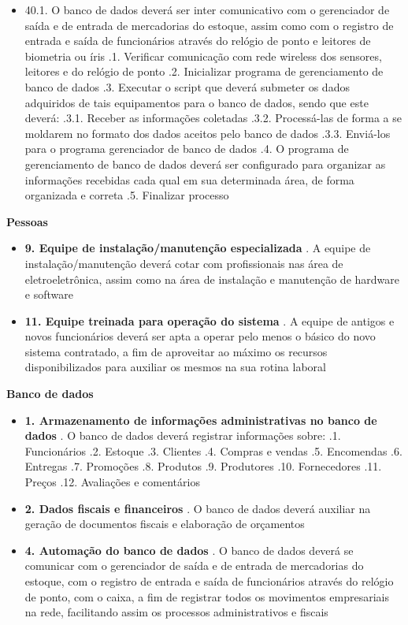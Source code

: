 \begin{itemize}[label={}]
\begin{itemize}[label={}]
		\item 40.1. O banco de dados deverá ser inter comunicativo com o gerenciador de saída e de entrada de mercadorias do estoque, assim como com o registro de entrada e saída de funcionários através do relógio de ponto e leitores de biometria ou íris 
			.1. Verificar comunicação com rede wireless dos sensores, leitores e do relógio de ponto
			.2. Inicializar programa de gerenciamento de banco de dados
			.3. Executar o script que deverá submeter os dados adquiridos de tais equipamentos para o banco de dados, sendo que este deverá: 
				.3.1. Receber as informações coletadas
				.3.2. Processá-las de forma a se moldarem no formato dos dados aceitos pelo banco de dados
				.3.3. Enviá-los para o programa gerenciador de banco de dados
			.4. O programa de gerenciamento de banco de dados deverá ser configurado para organizar as informações recebidas cada qual em sua determinada área, de forma organizada e correta
			.5. Finalizar processo
	\end{itemize}
\end{itemize}
\textbf{Pessoas}
\begin{itemize}[label={}]
	\item \textbf{9. Equipe de instalação/manutenção especializada}
		. A equipe de instalação/manutenção deverá cotar com profissionais nas área de eletroeletrônica, assim como na área de instalação e manutenção de hardware e software
	\item \textbf{11. Equipe treinada para operação do sistema} 
		. A equipe de antigos e novos funcionários deverá ser apta a operar pelo menos o básico do novo sistema contratado, a fim de aproveitar ao máximo os recursos disponibilizados para auxiliar os mesmos na sua rotina laboral
\end{itemize}
\textbf{Banco de dados}
\begin{itemize}[label={}]
	\item \textbf{1. Armazenamento de informações administrativas no banco de dados}
		. O banco de dados deverá registrar informações sobre: 
			.1. Funcionários
			.2. Estoque
			.3. Clientes
			.4. Compras e vendas
			.5. Encomendas
			.6. Entregas
			.7. Promoções
			.8. Produtos
			.9. Produtores
			.10. Fornecedores
			.11. Preços
			.12. Avaliações e comentários
	\item \textbf{2. Dados fiscais e financeiros}
		. O banco de dados deverá auxiliar na geração de documentos fiscais e elaboração de orçamentos 
	\item \textbf{4. Automação do banco de dados}
		. O banco de dados deverá se comunicar com o gerenciador de saída e de entrada de mercadorias do estoque, com o registro de entrada e saída de funcionários através do relógio de ponto, com o caixa, a fim de registrar todos os movimentos empresariais na rede, facilitando assim os processos administrativos e fiscais
\end{itemize}
